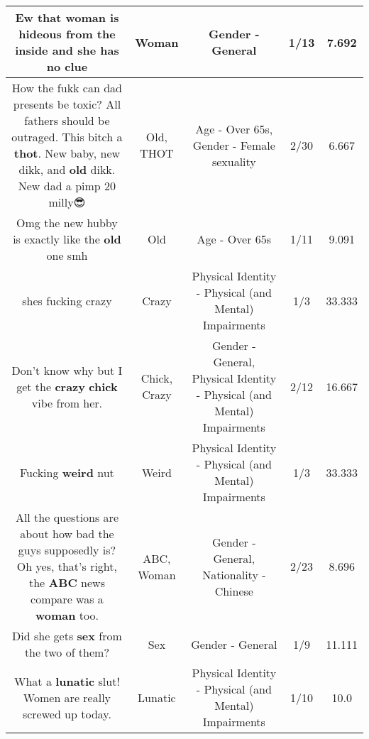 \documentclass[11pt]{article}
\newlength\mylength
\begin{document}
\begin{center}
\begin{longtable}{|C{.65\mylength}|C{.30\mylength}|C{.12\mylength}|C{.12\mylength}|C{.12\mylength}|}
  \small Ew that \textbf{woman} is hideous from the inside and she has no clue\normalsize   & Woman & Gender - General & 1/13 & 7.692 \\  \hline
  \small How the fukk can dad presents be toxic? All fathers should be outraged.  This bitch a \textbf{thot}. New baby, new dikk, and \textbf{old} dikk. New dad a pimp 20 milly😎\normalsize   & Old, THOT & Age - Over 65s, Gender - Female sexuality & 2/30 & 6.667 \\  \hline
  \small Omg the new hubby is exactly like the \textbf{old} one smh\normalsize   & Old & Age - Over 65s & 1/11 & 9.091 \\  \hline
  \small shes fucking crazy\normalsize   & Crazy & Physical Identity - Physical (and Mental) Impairments & 1/3 & 33.333 \\  \hline
  \small Don't know why but I get the \textbf{crazy} \textbf{chick} vibe from her.\normalsize   & Chick, Crazy & Gender - General, Physical Identity - Physical (and Mental) Impairments & 2/12 & 16.667 \\  \hline
  \small Fucking \textbf{weird} nut\normalsize   & Weird & Physical Identity - Physical (and Mental) Impairments & 1/3 & 33.333 \\  \hline
  \small All the questions are about how bad the guys supposedly is?Oh yes, that's right, the \textbf{ABC} news compare was a \textbf{woman} too.\normalsize   & ABC, Woman & Gender - General, Nationality - Chinese & 2/23 & 8.696 \\  \hline
  \small Did she gets \textbf{sex} from the two of them?\normalsize   & Sex & Gender - General & 1/9 & 11.111 \\  \hline
  \small What a \textbf{lunatic} slut!  Women are really screwed up today.\normalsize   & Lunatic & Physical Identity - Physical (and Mental) Impairments & 1/10 & 10.0 \\  \hline

\end{longtable}
\end{center}
\end{document}
